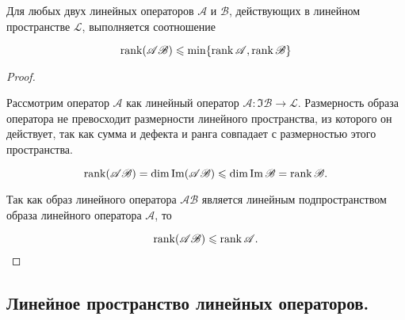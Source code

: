 Для любых двух линейных операторов $\mathscr{A}$ и $\mathscr{B}$, действующих в линейном пространстве $\mathcal{L}$, выполняется соотношение

$$\operatorname{\mathop{\mathrm{rank}}}(\mathscr{A}\mathscr{B}) \leqslant \min\{\operatorname{\mathop{\mathrm{rank}}}\mathscr{A}, \operatorname{\mathop{\mathrm{rank}}}\mathscr{B}\}$$

\begin{proof}~

    Рассмотрим оператор $\mathscr{A}$ как линейный оператор $\mathscr{A}\colon \Im\mathscr{B} \to \mathcal{L}$. Размерность образа оператора не превосходит размерности линейного пространства, из которого он действует, так как сумма и дефекта и ранга совпадает с размерностью этого пространства.

    $$\operatorname{\mathop{\mathrm{rank}}}(\mathscr{A}\mathscr{B}) = \dim \operatorname{\mathop{\mathrm{Im}}} (\mathscr{A}\mathscr{B}) \leqslant \dim \operatorname{\mathop{\mathrm{Im}}} \mathscr{B} = \operatorname{\mathop{\mathrm{rank}}} \mathscr{B}.$$
    
    Так как образ линейного оператора $\mathscr{A}\mathscr{B}$ является линейным подпространством образа линейного оператора $\mathscr{A}$, то
    
    $$\operatorname{\mathop{\mathrm{rank}}}(\mathscr{A}\mathscr{B}) \leqslant \operatorname{\mathop{\mathrm{rank}}} \mathscr{A}.$$
\end{proof}


\begin{comment}~

    Доказанное соотношение можно перенести на квадратные матрицы. 
    
    Получаем, 
    $$\rank{(AB)} \leq \min\{\rank A, \rank B\}.$$

    Пусть $B$ - невырожденная. То есть ее ранг равен размерности матрицы. 
    
    Тогда $\rank{(AB)} \leq \rank A$ и одновременно $\rank A = \rank ((AB)B^{-1}) \leq \rank (AB)$.

    То есть 
    
    $$\rank (AB) \leq \rank A \leq \rank (AB).$$
    
    Следовательно, при умножении матрицы $A$ справа на невырожденную матрицу ее ранг не изменяется. 
    
    При умножении матрицы $A$ слева на невырожденную матрицу ранг также не изменяется, что доказывается аналогично.
    \label{comment:comment_24_2}
\end{comment}


\newpage


\subsection{
    Линейное пространство линейных операторов.
}

